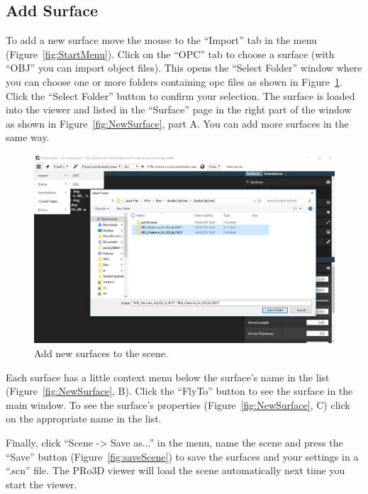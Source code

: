 \subsection{Add Surface}
\label{sec:addSurface}

To add a new surface move the mouse to the ``Import'' tab in the menu (Figure~\ref{fig:StartMenu}). Click on the ``OPC'' tab to choose a surface (with ``OBJ'' you can import object files).
This opens the ``Select Folder'' window where you can choose one or more folders containing opc files as shown in Figure~\ref{fig:AddSurface}. Click the ``Select Folder'' button to confirm your selection. The surface is loaded into the viewer and listed in the ``Surface'' page in the right part of the window as shown in Figure~\ref{fig:NewSurface}, part A.
You can add more surfaces in the same way.
	
	\begin{figure}[h]
    	\centering
    		\includegraphics[width=1\textwidth]{pics/AddSurface.png}
    	\caption[Add Surface]{Add new surfaces to the scene.}
    	\label{fig:AddSurface}
   \end{figure}
	
	
Each surface has a little context menu below the surface's name in the list (Figure~\ref{fig:NewSurface}, B). Click the ``FlyTo'' button to see the surface in the main window. To see the surface's properties (Figure~\ref{fig:NewSurface}, C) click on the appropriate name in the list.
	
Finally, click ``Scene -> Save as...'' in the menu, name the scene and press the ``Save'' button (Figure~\ref{fig:saveScene}) to save the surfaces and your settings in a ``.scn'' file. The PRo3D viewer will load the scene automatically next time you start the viewer.
	
